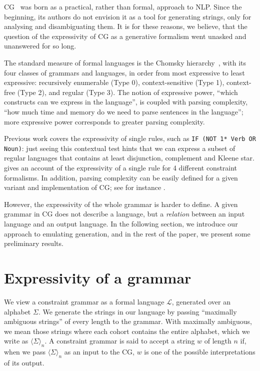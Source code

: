 \documentclass[11pt]{article}
\def\maxAmb#1{$\langle \Sigma \rangle_#1$}
\begin{document}
CG~\cite{karlsson1995constraint} was born as a practical, rather than formal, 
approach to NLP. 
Since the beginning, its authors do not envision it as a tool for 
generating strings, only for analysing and disambiguating them.
It is for these reasons, we believe, that the question of the expressivity of CG
as a generative formalism went unasked and unanswered for so long.

The standard measure of formal languages is the Chomsky hierarchy~\cite{chomsky1956hierarchy}, with its four
classes of grammars and languages, in order from most expressive to least expressive:
recursively enumerable (Type 0), context-sensitive (Type 1), context-free (Type 2), and
regular (Type 3).
The notion of expressive power, ``which constructs can we express in the language'', is coupled with parsing complexity, ``how much time and memory do we need to parse sentences in the language''; more expressive power corresponds to greater parsing complexity.

Previous work covers the expressivity of single rules, such as \texttt{IF (NOT 1* Verb OR Noun)}: 
just seeing this contextual test hints that we can express a subset of 
regular languages that contains at least disjunction, complement and 
Kleene star.  gives an account of the expressivity of 
a single rule for 4 different constraint formalisms. In addition, parsing 
complexity can be easily defined for a given variant and implementation of CG; 
see for instance .

However, the expressivity of the whole grammar is harder to define. 
A given grammar in CG does not describe a language, but a \emph{relation} 
between an input language and an output language. In the following section, 
we introduce our approach to emulating generation, and in the rest of the 
paper, we present some preliminary results.

\section{Expressivity of a grammar}

We view a constraint grammar as a formal language $\mathcal{L}$, generated over an 
alphabet $\Sigma$. We generate the strings in our language by passing
``maximally ambiguous strings'' of every length to the grammar. 
With maximally ambiguous, we mean those strings where each cohort contains the 
entire alphabet, which we write as \maxAmb{n}. 
A constraint grammar is said to accept a string $w$ of length $n$ if, 
when we pass \maxAmb{n} as an input to the CG,
$w$ is one of the possible interpretations of its output.
\end{document}

